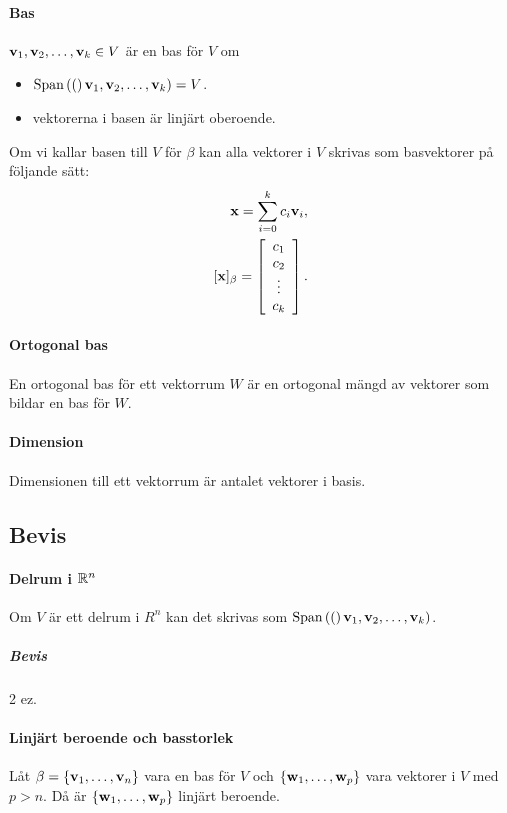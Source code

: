 \paragraph{Bas}
$\vect{v}_1, \vect{v}_2, \dots, \vect{v}_k\in V$ är en bas för $V$ om
\begin{itemize}
	\item $\Span(\vect{v}_1, \vect{v}_2, \dots, \vect{v}_k) = V$.
	\item vektorerna i basen är linjärt oberoende.
\end{itemize}
Om vi kallar basen till $V$ för $\beta$ kan alla vektorer i $V$ skrivas som basvektorer på följande sätt:
\begin{align*}
	\vect{x} = \sum\limits_{i = 0}^{k}c_i\vect{v}_i, \\
	[\vect{x}]_\beta =
	\left[\begin{array}{c}
		c_1 \\
		c_2 \\
		\vdots \\
		c_k
	\end{array}\right].
\end{align*}

\paragraph{Ortogonal bas}
En ortogonal bas för ett vektorrum $W$ är en ortogonal mängd av vektorer som bildar en bas för $W$.

\paragraph{Dimension}
Dimensionen till ett vektorrum är antalet vektorer i basis.

\subsection{Bevis}

\paragraph{Delrum i $\mathbb{R}^n$}
Om $V$ är ett delrum i $R^n$ kan det skrivas som $\Span(\vect{v}_1, \vect{v}_2, \dots, \vect{v}_k)$.

\subparagraph{Bevis}
2 ez.

\paragraph{Linjärt beroende och basstorlek}
Låt $\beta = \{\vect{v}_1, \dots, \vect{v}_n\}$ vara en bas för $V$ och $\{\vect{w}_1, \dots, \vect{w}_p\}$ vara vektorer i $V$ med $p > n$. Då är $\{\vect{w}_1, \dots, \vect{w}_p\}$ linjärt beroende.

